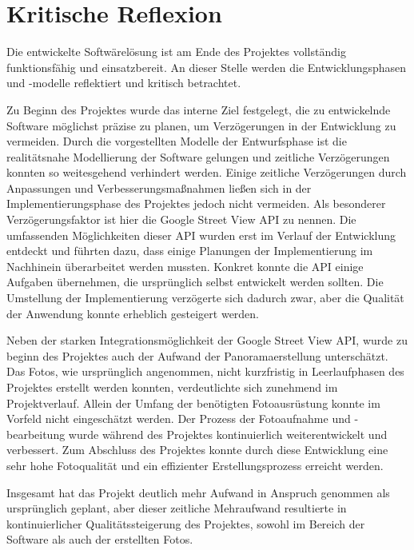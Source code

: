 \section{Kritische Reflexion}
\label{sec:KritischeReflexion}

Die entwickelte Softwärelösung ist am Ende des Projektes vollständig funktionsfähig und einsatzbereit.
An dieser Stelle werden die Entwicklungsphasen und -modelle reflektiert und kritisch betrachtet.

Zu Beginn des Projektes wurde das interne Ziel festgelegt, die zu entwickelnde Software möglichst präzise
zu planen, um Verzögerungen in der Entwicklung zu vermeiden. Durch die vorgestellten Modelle der Entwurfsphase
ist die realitätsnahe Modellierung der Software gelungen und zeitliche Verzögerungen konnten so weitesgehend
verhindert werden. Einige zeitliche Verzögerungen durch Anpassungen und Verbesserungsmaßnahmen ließen sich in der
Implementierungsphase des Projektes jedoch nicht vermeiden. Als besonderer Verzögerungsfaktor ist hier die
Google Street View API zu nennen. Die umfassenden Möglichkeiten dieser API wurden erst im Verlauf der
Entwicklung entdeckt und führten dazu, dass einige Planungen der Implementierung im Nachhinein überarbeitet
werden mussten. Konkret konnte die API einige Aufgaben übernehmen, die ursprünglich selbst
entwickelt werden sollten. Die Umstellung der Implementierung verzögerte sich dadurch zwar, aber die
Qualität der Anwendung konnte erheblich gesteigert werden.

Neben der starken Integrationsmöglichkeit der Google Street View API, wurde zu beginn des Projektes auch
der Aufwand der Panoramaerstellung unterschätzt. Das Fotos, wie ursprünglich angenommen, nicht kurzfristig
in Leerlaufphasen des Projektes erstellt werden konnten, verdeutlichte sich zunehmend im Projektverlauf.
Allein der Umfang der benötigten Fotoausrüstung konnte im Vorfeld nicht eingeschätzt werden.
Der Prozess der Fotoaufnahme und -bearbeitung wurde während des Projektes kontinuierlich weiterentwickelt
und verbessert. Zum Abschluss des Projektes konnte durch diese Entwicklung eine sehr hohe Fotoqualität
und ein effizienter Erstellungsprozess erreicht werden.

Insgesamt hat das Projekt deutlich mehr Aufwand in Anspruch genommen als ursprünglich geplant,
aber dieser zeitliche Mehraufwand resultierte in kontinuierlicher Qualitätssteigerung des Projektes, sowohl
im Bereich der Software als auch der erstellten Fotos.